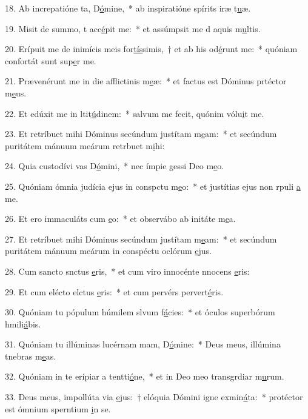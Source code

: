 18. Ab increpatióne ta, D\uline{ó}mine,~* ab inspiratióne spírits iræ t\uline{u}æ.\par 
19. Misit de summo, t acc\uline{é}pit me:~* et assúmpsit me d aquis m\uline{u}ltis.\par 
20. Erípuit me de inimícis meis for\uline{tís}simis,~† et ab his  od\uline{é}runt me:~* quóniam confortát sunt sup\uline{e}r me.\par 
21. Prævenérunt me in die afflictinis m\uline{e}æ:~* et factus est Dóminus prtéctor m\uline{e}us.\par 
22. Et edúxit me in ltit\uline{ú}dinem:~* salvum me fecit, quónim vólu\uline{i}t me.\par 
23. Et retríbuet mihi Dóminus secúndum justítam m\uline{e}am:~* et secúndum puritátem mánuum meárum retrbuet m\uline{i}hi:\par 
24. Quia custodívi vas D\uline{ó}mini,~* nec ímpie gessi  Deo m\uline{e}o.\par 
25. Quóniam ómnia judícia ejus in conspctu m\uline{e}o:~* et justítias ejus non rpuli \uline{a} me.\par 
26. Et ero immaculáts cum \uline{e}o:~* et observábo ab initáte m\uline{e}a.\par 
27. Et retríbuet mihi Dóminus secúndum justítam m\uline{e}am:~* et secúndum puritátem mánuum meárum in conspéctu oclórum \uline{e}jus.\par 
28. Cum sancto snctus \uline{e}ris,~* et cum viro innocénte nnocens \uline{e}ris:\par 
29. Et cum elécto elctus \uline{e}ris:~* et cum pervérs pervert\uline{é}ris.\par 
30. Quóniam tu pópulum húmilem slvum f\uline{á}cies:~* et óculos superbórum hmili\uline{á}bis.\par 
31. Quóniam tu illúminas lucérnam mam, D\uline{ó}mine:~* Deus meus, illúmina tnebras m\uline{e}as.\par 
32. Quóniam in te erípiar a tentti\uline{ó}ne,~* et in Deo meo transgrdiar m\uline{u}rum.\par 
33. Deus meus, impollúta via \uline{e}jus:~† elóquia Dómini igne exmin\uline{á}ta:~* protéctor est ómnium sperntium \uline{i}n se.\par 
